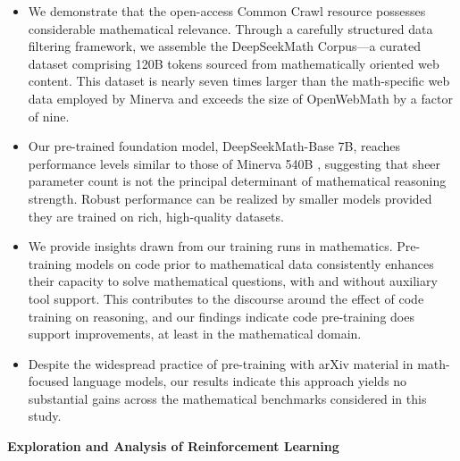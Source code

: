 \begin{itemize}[topsep=0pt]
    \item We demonstrate that the open-access Common Crawl resource possesses considerable mathematical relevance. Through a carefully structured data filtering framework, we assemble the DeepSeekMath Corpus—a curated dataset comprising 120B tokens sourced from mathematically oriented web content. This dataset is nearly seven times larger than the math-specific web data employed by Minerva \citep{minerva} and exceeds the size of OpenWebMath \citep{openwebmath} by a factor of nine.

    \item Our pre-trained foundation model, DeepSeekMath-Base 7B, reaches performance levels similar to those of Minerva 540B \citep{minerva}, suggesting that sheer parameter count is not the principal determinant of mathematical reasoning strength. Robust performance can be realized by smaller models provided they are trained on rich, high-quality datasets.

    \item We provide insights drawn from our training runs in mathematics. Pre-training models on code prior to mathematical data consistently enhances their capacity to solve mathematical questions, with and without auxiliary tool support. This contributes to the discourse around the effect of code training on reasoning, and our findings indicate code pre-training does support improvements, at least in the mathematical domain.

    \item Despite the widespread practice of pre-training with arXiv material in math-focused language models, our results indicate this approach yields no substantial gains across the mathematical benchmarks considered in this study.
\end{itemize}

\textbf{Exploration and Analysis of Reinforcement Learning}

